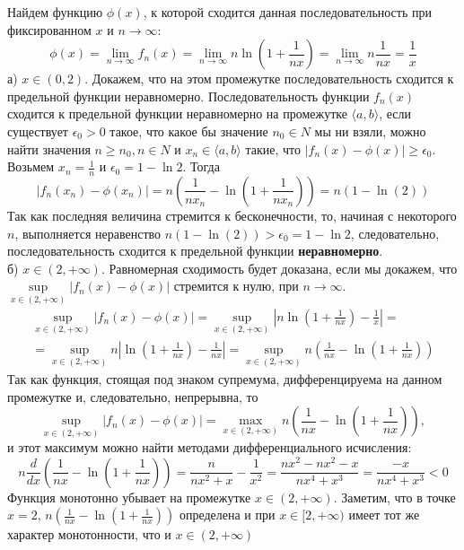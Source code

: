 \documentclass[a5paper, 10pt]{article}
\theoremstyle{definition}
\theoremstyle{plain}
\theoremstyle{remark}
\begin{document}
Найдем функцию $\phi(x)$, к которой сходится данная последовательность при фиксированном $x$ и $n \to \infty$:
\begin{equation}
\phi(x) = \lim_{n \to \infty} f_n (x) = \lim_{n \to \infty} n \ln \left( 1+ \frac{1}{nx} \right) =
\lim_{n \to \infty} n  \frac{1}{nx} = \frac{1}{x}
\end{equation}
а)  $x \in (0, 2)$. Докажем, что на этом промежутке последовательность сходится к предельной функции неравномерно. Последовательность функции $f_n (x)$ сходится к предельной функции неравномерно на промежутке $\langle a, b \rangle$, если существует $\epsilon_0 > 0$ такое, что какое бы значение $n_0 \in N$ мы ни взяли, можно найти значения $n \geq n_0, n \in N$ и $x_n \in \langle a, b \rangle$ такие, что $\left| f_n (x) - \phi(x)  \right| \geq \epsilon_0$. \\
Возьмем $x_n = \frac{1}{n}$ и $\epsilon_0 = 1 - \ln2$. Тогда
\begin{equation*}
\left| f_n (x_n) - \phi(x_n)  \right| = n \left( \frac{1}{nx_n}- \ln \left( 1+ \frac{1}{nx_n} \right)  \right) =  
 n \left( 1- \ln \left( 2 \right)  \right)
\end{equation*}
Так как последняя величина стремится к бесконечности, то, начиная с некоторого $n$, выполняется неравенство $ n \left( 1- \ln \left( 2 \right)  \right) > \epsilon_0 = 1 - \ln 2 $, следовательно, последовательность сходится к предельной функции \textbf{неравномерно}.\\

б)  $x \in (2, + \infty)$. Равномерная сходимость будет доказана, если мы докажем, что $\sup \limits_{x \in (2, + \infty)} \left| f_n (x) - \phi(x)  \right| $ стремится к нулю, при $n \to \infty$.
\begin{multline}
\sup \limits_{x \in (2, + \infty) } \left| f_n (x) - \phi(x)  \right| = \sup \limits_{x \in (2, + \infty) } \left| n \ln \left( 1+ \frac{1}{nx} \right) - \frac{1}{x}  \right| =\\ = \sup \limits_{x \in (2, + \infty) }  n \left| \ln \left( 1+ \frac{1}{nx} \right) - \frac{1}{nx} \right| 
= \sup \limits_{x \in (2, + \infty) }  n \left( \frac{1}{nx}- \ln \left( 1+ \frac{1}{nx} \right)  \right)
\end{multline}
Так как функция, стоящая под знаком супремума, дифференцируема на данном промежутке и, следовательно, непрерывна, то
\begin{equation*}
\sup \limits_{x \in (2, + \infty) } \left| f_n (x) - \phi(x)  \right| = \max \limits_{x \in (2, + \infty) }  n \left( \frac{1}{nx}- \ln \left( 1+ \frac{1}{nx} \right)  \right),
\end{equation*}
и этот максимум можно найти методами дифференциального исчисления:
\begin{equation*}
n \frac{d}{dx} \left(  \frac{1}{nx}- \ln \left( 1+ \frac{1}{nx} \right)  \right) = \frac{n}{nx^2+x}-\frac{1}{x^2} = 
\frac{nx^2-nx^2-x}{nx^4+x^3} = \frac{-x}{nx^4+x^3} < 0
\end{equation*}
Функция монотонно убывает на промежутке  $x \in (2, + \infty)$. Заметим, что в точке $x = 2$,  $n \left( \frac{1}{nx}- \ln \left( 1+ \frac{1}{nx} \right)  \right)$ определена и при $x \in [2, + \infty)$ имеет тот же характер монотонности, что и $x \in (2, + \infty)$
\end{document}
